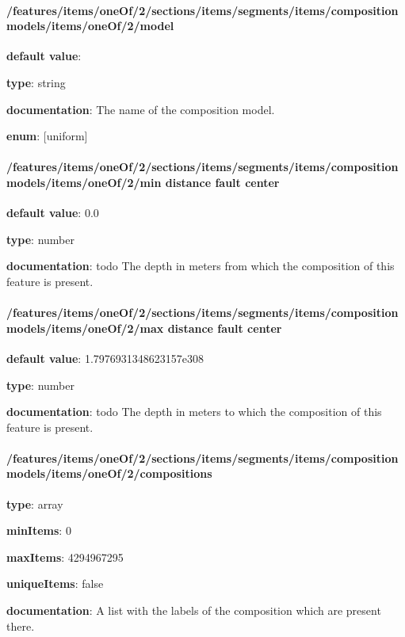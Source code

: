 \paragraph{/features/items/oneOf/2/sections/items/segments/items/composition models/items/oneOf/2/model} \begin{itemized}
\item {\bf default value}: 
\item {\bf type}: string
\item {\bf documentation}: The name of the composition model.
\item {\bf enum}: [uniform]\end{itemized}\paragraph{/features/items/oneOf/2/sections/items/segments/items/composition models/items/oneOf/2/min distance fault center} \begin{itemized}
\item {\bf default value}: 0.0
\item {\bf type}: number
\item {\bf documentation}: todo The depth in meters from which the composition of this feature is present.
\end{itemized}\paragraph{/features/items/oneOf/2/sections/items/segments/items/composition models/items/oneOf/2/max distance fault center} \begin{itemized}
\item {\bf default value}: 1.7976931348623157e308
\item {\bf type}: number
\item {\bf documentation}: todo The depth in meters to which the composition of this feature is present.
\end{itemized}\paragraph{/features/items/oneOf/2/sections/items/segments/items/composition models/items/oneOf/2/compositions} \begin{itemized}
\item {\bf type}: array
\item {\bf minItems}: 0
\item {\bf maxItems}: 4294967295
\item {\bf uniqueItems}: false
\item {\bf documentation}: A list with the labels of the composition which are present there.

\end{itemized}
